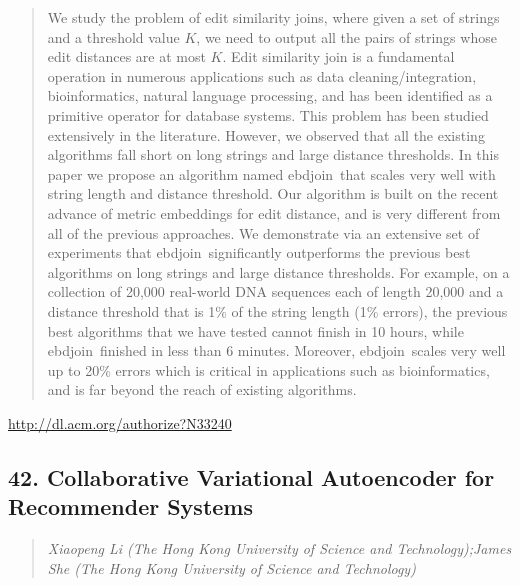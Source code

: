 \documentclass{article}
\begin{document}
\begin{quote}
We study the problem of edit similarity joins, where given a set of strings and a threshold value $K$, we need to output all the pairs of strings whose edit distances are at most $K$. Edit similarity join is a fundamental operation in numerous applications such as data cleaning/integration, bioinformatics, natural language processing, and has been identified as a primitive operator for database systems. This problem has been studied extensively in the literature. However, we observed that all the existing algorithms fall short on long strings and large distance thresholds. In this paper we propose an algorithm named ebdjoin\ that scales very well with string length and distance threshold. Our algorithm is built on the recent advance of metric embeddings for edit distance, and is very different from all of the previous approaches. We demonstrate via an extensive set of experiments that ebdjoin\ significantly outperforms the previous best algorithms on long strings and large distance thresholds. For example, on a collection of 20,000 real-world DNA sequences each of length 20,000 and a distance threshold that is 1\% of the string length (1\% errors), the previous best algorithms that we have tested cannot finish in 10 hours, while ebdjoin\ finished in less than 6 minutes. Moreover, ebdjoin\ scales very well up to 20\% errors which is critical in applications such as bioinformatics, and is far beyond the reach of existing algorithms.
\end{quote}

\href{http://dl.acm.org/authorize?N33240}{http://dl.acm.org/authorize?N33240}

\subsection{42. Collaborative Variational Autoencoder for Recommender Systems}

\begin{quote}
\footnotesize{\textit{Xiaopeng Li (The Hong Kong University of Science and Technology);James She (The Hong Kong University of Science and Technology)}}

\end{quote}
\end{document}
